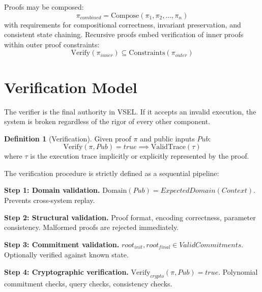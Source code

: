 \documentclass[11pt,a4paper]{article}
\theoremstyle{definition}
\newtheorem{definition}{Definition}[section]
\newcommand{\Verify}{\mathrm{Verify}}
\newcommand{\ValidTrace}{\mathrm{ValidTrace}}
\newcommand{\Domain}{\mathrm{Domain}}
\begin{document}
Proofs may be composed:
\begin{equation}
\pi_{\mathit{combined}} = \mathrm{Compose}(\pi_1, \pi_2, \ldots, \pi_n)
\end{equation}
with requirements for compositional correctness, invariant preservation, and consistent state chaining. Recursive proofs embed verification of inner proofs within outer proof constraints:
\begin{equation}
\Verify(\pi_{\mathit{inner}}) \subseteq \mathrm{Constraints}(\pi_{\mathit{outer}})
\end{equation}

\section{Verification Model}
\label{sec:verification}

The verifier is the final authority in VSEL. If it accepts an invalid execution, the system is broken regardless of the rigor of every other component.

\begin{definition}[Verification]
\label{def:verification}
Given proof $\pi$ and public inputs $\mathit{Pub}$:
\begin{equation}
\Verify(\pi, \mathit{Pub}) = \mathit{true} \implies \ValidTrace(\tau)
\end{equation}
where $\tau$ is the execution trace implicitly or explicitly represented by the proof.
\end{definition}

The verification procedure is strictly defined as a sequential pipeline:

\noindent\textbf{Step 1: Domain validation.} $\Domain(\mathit{Pub}) = \mathit{ExpectedDomain}(\mathit{Context})$. Prevents cross-system replay.

\noindent\textbf{Step 2: Structural validation.} Proof format, encoding correctness, parameter consistency. Malformed proofs are rejected immediately.

\noindent\textbf{Step 3: Commitment validation.} $\mathit{root}_{\mathit{init}}, \mathit{root}_{\mathit{final}} \in \mathit{ValidCommitments}$. Optionally verified against known state.

\noindent\textbf{Step 4: Cryptographic verification.} $\Verify_{\mathit{crypto}}(\pi, \mathit{Pub}) = \mathit{true}$. Polynomial commitment checks, query checks, consistency checks.
\end{document}
